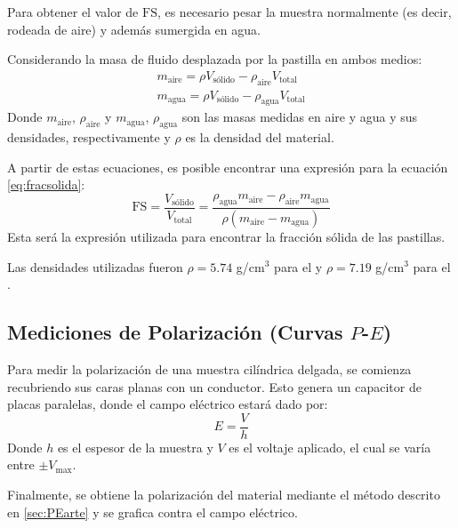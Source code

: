 \documentclass[../main.tex]{subfiles}
\begin{document}
Para obtener el valor de $\text{FS}$, es necesario pesar la muestra normalmente (es decir, rodeada de aire) y además sumergida en agua.

Considerando la masa de fluido desplazada por la pastilla en ambos medios:
\begin{equation}
    \begin{split}
        m_\text{aire}=\rho V_\text{sólido} - \rho_\text{aire} V_\text{total}\\
        m_\text{agua}=\rho V_\text{sólido} - \rho_\text{agua} V_\text{total}
    \end{split}
    \label{eq:masasaireagua}
\end{equation}
Donde $m_\text{aire}$, $\rho_\text{aire}$  y $m_\text{agua}$, $\rho_\text{agua}$ son las masas medidas en aire y agua y sus densidades, respectivamente y $\rho$ es la densidad del material.

A partir de estas ecuaciones, es posible encontrar una expresión para la ecuación \ref{eq:fracsolida}:
\begin{equation}
    \text{FS}=\dfrac{V_\text{sólido}}{V_\text{total}}=\dfrac{\rho_\text{agua}m_\text{aire}-\rho_\text{aire}m_\text{agua}}{\rho(m_\text{aire}-m_\text{agua})}
    \label{eq:fracsolidamasas}
\end{equation}
Esta será la expresión utilizada para encontrar la fracción sólida de las pastillas.

Las densidades utilizadas fueron $\rho=5.74$ g/cm$^3$ para el \neod{} \cite{densneod} y $\rho=7.19$ g/cm$^3$ para el \sama{} \cite{denssama}.

\subsection{Mediciones de Polarización (Curvas \texorpdfstring{$P$}{P}-\texorpdfstring{$E$}{E})}
Para medir la polarización de una muestra cilíndrica delgada, se comienza recubriendo sus caras planas con un conductor. Esto genera un capacitor de placas paralelas, donde el campo eléctrico estará dado por:
\begin{equation}
    E=\dfrac{V}{h}
    \label{eq:campovoltaje}
\end{equation}
Donde $h$ es el espesor de la muestra y $V$ es el voltaje aplicado, el cual se varía entre $\pm V_\text{max}$.

Finalmente, se obtiene la polarización del material mediante el método descrito en \ref{sec:PEarte} y se grafica contra el campo eléctrico.
\end{document}
